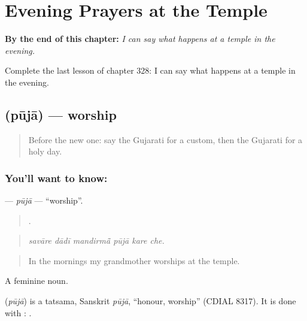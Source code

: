 
\chapter{Evening Prayers at the Temple}
\label{ch:gu-evening-prayers-at-the-temple}

\begin{chapteropening}
\textbf{By the end of this chapter:} \emph{I can say what happens at a temple in the evening.}

Complete the last lesson of chapter 328: I can say what happens at a temple in the evening.
\end{chapteropening}

\section[\texorpdfstring{\gu{પૂજા} (pūjā)}{પૂજા (pūjā)}]{ (pūjā) — worship}

\label{lesson:GU-C328-puja}



\begin{quote}
Before the new one: say the Gujarati for a custom, then the Gujarati for a holy day.
\end{quote}

\subsection*{You'll want to know: }
\textbf{} — \emph{pūjā} — \textquotedblleft{}worship\textquotedblright{}.

\begin{quote}
     .
\end{quote}

\begin{quote}
\emph{savāre dādī mandirmā̃ pūjā kare che.}
\end{quote}

\begin{quote}
In the mornings my grandmother worships at the temple.
\end{quote}

A feminine noun.

\begin{cousinweb}
\textbf{} (\emph{pūjā}) is a tatsama, Sanskrit \emph{pūjā}, \textquotedblleft{}honour, worship\textquotedblright{} (CDIAL 8317). It is done with \textbf{}: \textbf{  }.
\end{cousinweb}

